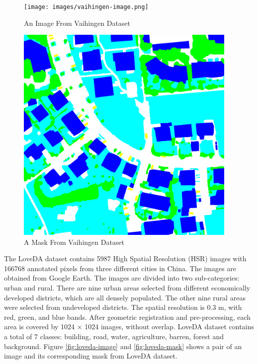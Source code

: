 \begin{figure}[!htb]
    \centering
    \begin{minipage}{0.5\textwidth}
        \centering
        \texttt{[image: images/vaihingen-image.png]}
        \caption{An Image From Vaihingen Dataset \protect\cite{potsdam-vaihingen}}
        \label{fig:vaihingen-image}
    \end{minipage}\hfill
    \begin{minipage}{0.5\textwidth}
        \centering
        \includegraphics[width=0.95\textwidth, height=0.35\textheight]{images/vaihingen-mask.png}
\centering
\caption{A Mask From Vaihingen Dataset \protect\cite{potsdam-vaihingen}}
\label{fig:vaihingen-mask}
    \end{minipage}
\end{figure}


\FloatBarrier


The LoveDA dataset \cite{loveda} contains 5987 High Spatial Resolution (HSR) images with 166768 annotated pixels from three different cities in China. The images are obtained from Google Earth. The images are divided into two sub-categories: urban and rural. There are nine urban areas selected from different economically developed districts, which are all densely populated. The other nine rural areas were selected from undeveloped districts. The spatial resolution is 0.3 m, with
red, green, and blue bands. After geometric registration and pre-processing, each area is covered by 1024 × 1024 images, without overlap. LoveDA dataset contains a total of 7 classes: building, road, water, agriculture, barren, forest and background. Figure \ref{fig:loveda-image} and \ref{fig:loveda-mask} shows a pair of an image and its corresponding mask from LoveDA dataset.

